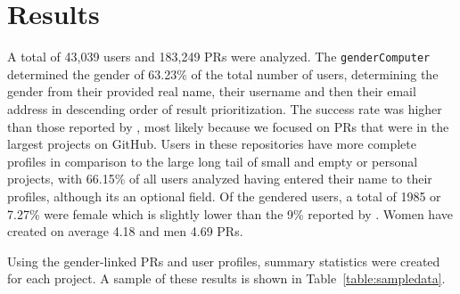 

\section{Results}

A total of 43,039 users and 183,249 \ac{PR}s were analyzed.
The \lstinline|genderComputer| determined the gender of 63.23\% of the total number of users, determining the gender from their provided real name, their username and then their email address in descending order of result prioritization.
The success rate was higher than those reported by \citeauthor{vasilescu:2012:6542459}, most likely because we focused on \ac{PR}s that were in the largest projects on GitHub. Users in these repositories have more complete profiles in comparison to the large long tail of small and empty or personal projects, with 66.15\% of all users analyzed having entered their name to their profiles, although its an optional field. Of the gendered users, a total of 1985 or 7.27\% were female which is slightly lower than the 9\% reported by \cite{vasilescu:2012:6542459}. Women have created on average 4.18 and men 4.69 \ac{PR}s.

Using the gender-linked \ac{PR}s and user profiles, summary statistics were created for each project. A sample of these results is shown in Table~\ref{table:sampledata}.


